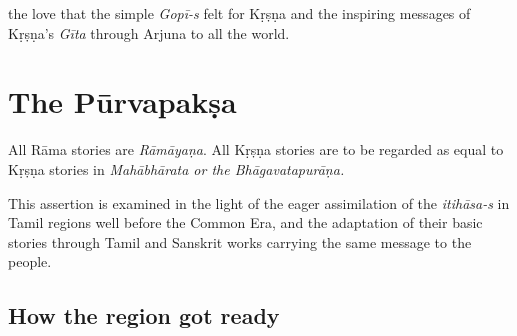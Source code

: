 the love that the simple \textit{Gopī-s} felt for Kṛṣṇa and the inspiring messages of Kṛṣṇa’s \textit{Gīta} through Arjuna to all the world.


\section*{The Pūrvapakṣa}

All Rāma stories are \textit{Rāmāyaṇa}. All Kṛṣṇa stories are to be regarded as equal to Kṛṣṇa stories in \textit{Mahābhārata or the Bhāgavatapurāṇa.}

This assertion is examined in the light of the eager assimilation of the \textit{itihāsa-s} in Tamil regions well before the Common Era, and the adaptation of their basic stories through Tamil and Sanskrit works carrying the same message to the people.

\subsection{How the region got ready}

